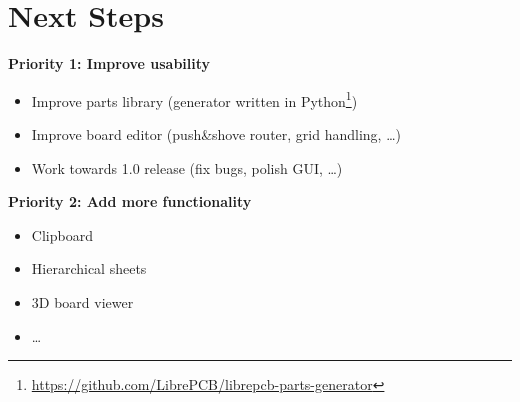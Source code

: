 \section{Next Steps}

\begin{frame}{\secname}
  \textbf{Priority 1: Improve usability}
  \begin{itemize}
    \item Improve parts library (generator written in
      Python\footnote{\url{https://github.com/LibrePCB/librepcb-parts-generator}})
    \item Improve board editor (push\&shove router, grid handling, \ldots)
    \item Work towards 1.0 release (fix bugs, polish GUI, \ldots)
  \end{itemize}

  \pause

  \textbf{Priority 2: Add more functionality}
  \begin{itemize}
    \item Clipboard \faCut\ \faCopy\ \faPaste\
    \item Hierarchical sheets
    \item 3D board viewer
    \item \dots
  \end{itemize}
\end{frame}
